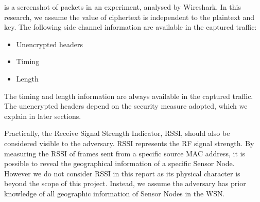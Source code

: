  is a screenshot of packets in an experiment, analysed by Wireshark\cite{Wireshark}. In this research, we assume the value of ciphertext is independent to the plaintext and key. The following side channel information are available in the captured traffic:

\begin{itemize}
	\item Unencrypted headers
	\item Timing
	\item Length
\end{itemize}

The timing and length information are always available in the captured traffic. The unencrypted headers depend on the security measure adopted, which we explain in later sections.

Practically, the Receive Signal Strength Indicator, RSSI, should also be considered visible to the adversary. RSSI represents the RF signal strength. By measuring the RSSI of frames sent from a specific source MAC address,  it is possible to reveal the geographical information of a specific Sensor Node. However we do not consider RSSI in this report as its physical character is beyond the scope of this project. Instead, we assume the adversary has prior knowledge of all geographic information of Sensor Nodes in the WSN.

